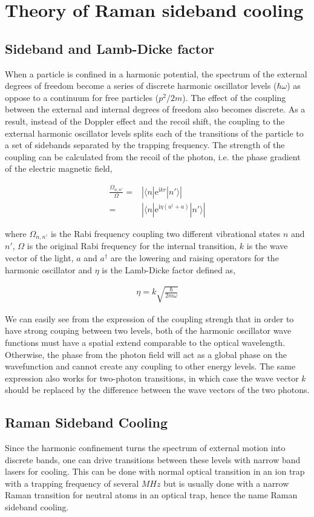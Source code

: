 \documentclass[aps,twocolumn,secnumarabic,balancelastpage,amsmath,amssymb,nofootinbib]{revtex4}
\newcommand{\ue}{\mathrm{e}}
\newcommand{\ui}{\mathrm{i}}
\newcommand{\eqar}[1]
{
  \begin{align*}
    #1
  \end{align*}
}
\newcommand{\eqarn}[1]
{
  \begin{align}
    #1
  \end{align}
}
\newcommand{\paren}[1]{{\left({#1}\right)}}
\newcommand{\abs}[1]{{\left|{#1}\right|}}
\begin{document}
\section{Theory of Raman sideband cooling}
\subsection{Sideband and Lamb-Dicke factor}
When a particle is confined in a harmonic potential, the spectrum of the external degrees of freedom become a series of discrete harmonic oscillator levels ($\hbar\omega$) as oppose to a continuum for free particles ($p^2/2m$). The effect of the coupling between the external and internal degrees of freedom also becomes discrete. As a result, instead of the Doppler effect and the recoil shift, the coupling to the external harmonic oscillator levels splits each of the transitions of the particle to a set of sidebands separated by the trapping frequency. The strength of the coupling can be calculated from the recoil of the photon, i.e. the phase gradient of the electric magnetic field,
\eqarn{
  \frac{\Omega_{n,n'}}{\Omega}=&\abs{\langle n|\ue^{\ui kr}|n'\rangle}\\
  =&\abs{\langle n|\ue^{\ui \eta\paren{a^\dagger+a}}|n'\rangle}\label{lamb-dicke}
}
where $\Omega_{n,n'}$ is the Rabi frequency coupling two different vibrational states $n$ and $n'$, $\Omega$ is the original Rabi frequency for the internal transition, $k$ is the wave vector of the light, $a$ and $a^\dagger$ are the lowering and raising operators for the harmonic oscillator and $\eta$ is the Lamb-Dicke factor defined as,
\eqar{
  \eta=k\sqrt{\frac{\hbar}{2m\omega}}
}
We can easily see from the expression of the coupling strengh that in order to have strong couping between two levels, both of the harmonic oscillator wave functions must have a spatial extend comparable to the optical wavelength. Otherwise, the phase from the photon field will act as a global phase on the wavefunction and cannot create any coupling to other energy levels. The same expression also works for two-photon transitions, in which case the wave vector $k$ should be replaced by the difference between the wave vectors of the two photons.

\subsection{Raman Sideband Cooling}
Since the harmonic confinement turns the spectrum of external motion into discrete bands, one can drive transitions between these levels with narrow band lasers for cooling. This can be done with normal optical transition in an ion trap with a trapping frequency of several $MHz$ but is usually done with a narrow Raman transition for neutral atoms in an optical trap, hence the name Raman sideband cooling.\\
\end{document}
